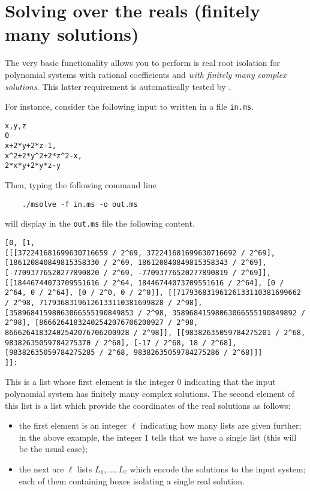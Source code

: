 \documentclass[a4paper,english,11pt]{scrartcl}
\theoremstyle{definition}
\theoremstyle{remark}
\begin{document}
\section{Solving over the reals (finitely many solutions)}

The very basic functionality \msolve allows you to perform is real root
isolation for polynomial systems with rational coefficients and {\em with
  finitely many complex solutions}. This latter requirement is automatically
tested by \msolve. 

For instance, consider the following input to \msolve written in a file
\verb+in.ms+.
\begin{tcolorbox}
\begin{verbatim}
x,y,z
0
x+2*y+2*z-1,
x^2+2*y^2+2*z^2-x,
2*x*y+2*y*z-y
\end{verbatim}  
\end{tcolorbox}
Then, typing the following command line
\begin{tcolorbox}
  \begin{verbatim}
    ./msolve -f in.ms -o out.ms 
  \end{verbatim}
\end{tcolorbox}
will display in the \verb+out.ms+ file the following content. 
\begin{tcolorbox}
{\tiny\begin{lstlisting}[breaklines]
[0, [1,
[[[372241681699630716659 / 2^69, 372241681699630716692 / 2^69], [186120840849815358330 / 2^69, 186120840849815358343 / 2^69], [-77093776520277890820 / 2^69, -77093776520277890819 / 2^69]], [[18446744073709551616 / 2^64, 18446744073709551616 / 2^64], [0 / 2^64, 0 / 2^64], [0 / 2^0, 0 / 2^0]], [[71793683196126133110381699662 / 2^98, 71793683196126133110381699828 / 2^98], [35896841598063066555190849853 / 2^98, 35896841598063066555190849892 / 2^98], [86662641832402542076706200927 / 2^98, 86662641832402542076706200928 / 2^98]], [[98382635059784275201 / 2^68, 98382635059784275370 / 2^68], [-17 / 2^68, 18 / 2^68], [98382635059784275285 / 2^68, 98382635059784275286 / 2^68]]]
]]:
\end{lstlisting}}
\end{tcolorbox}
This is a list whose first element is the integer $0$ indicating that the input
polynomial system has finitely many complex solutions. The second element of
this list is a list which provide the coordinates of the real solutions as
follows:
\begin{itemize}
\item the first element is an integer $\ell$ indicating how many lists are given
  further; in the above example, the integer $1$ tells that we have a single
  list (this will be the usual case);
\item the next are $\ell$ lists $L_1, \ldots, L_\ell$ which encode the solutions
  to the input system; each of them containing boxes isolating a single real
  solution. 
\end{itemize}
\end{document}
